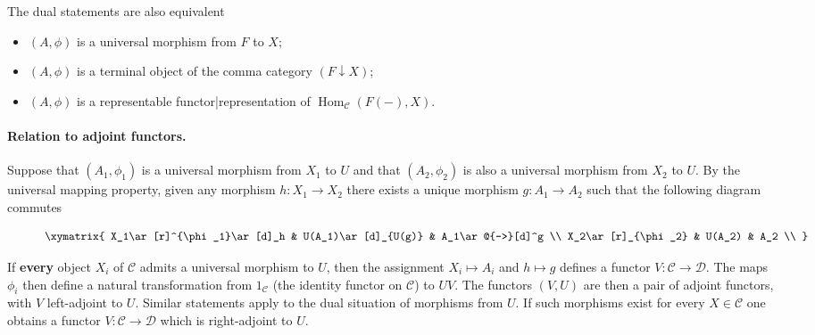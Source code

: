\documentclass[12pt]{article}
\newcommand{\Hom}{\operatorname{Hom}}
\begin{document}
The dual statements are also equivalent
\begin{itemize}
\item $(A, \phi)$ is a universal morphism from $F$ to $X$;
\item $(A, \phi)$ is a terminal object of the comma category $(F
  \downarrow X)$;
\item $(A, \phi)$ is a representable functor|representation of
  $\Hom_{\mathcal{C}}(F(-),X)$.
\end{itemize}


\paragraph{Relation to adjoint functors.}
Suppose that $(A_1, \phi_1)$ is a universal morphism from $X_1$ to $U$
and that $(A_2,\phi_2)$ is also a universal morphism from $X_2$ to $U$.
By the universal mapping property, given any morphism $h \colon X_1 \to X_2$
there exists a unique morphism $g \colon A_1 \to A_2$ such that the
following diagram commutes
\begin{figure}[h]
  \[\xymatrix{
     X_1\ar[r]^{\phi_1}\ar[d]_h & U(A_1)\ar[d]_{U(g)} & A_1\ar@{-->}[d]^g \\
     X_2\ar[r]_{\phi_2} & U(A_2) & A_2 \\
   }\]
\end{figure}
If \textbf{every} object $X_i$ of $\mathcal{C}$ admits a universal morphism to
$U$, then the assignment $X_i\mapsto A_i$ and $h \mapsto g$ defines a
functor $V\colon \mathcal{C} \to \mathcal{D}$. The maps $\phi_i$ then define a natural
transformation from $1_{\mathcal{C}}$ (the identity functor on $\mathcal{C}$) to $U
V$. The functors $(V, U)$ are then a pair of adjoint functors, with
$V$ left-adjoint to $U$.
Similar statements apply to the dual situation of morphisms from
$U$. If such morphisms exist for every $X\in \mathcal{C}$ one obtains a
functor $V \colon \mathcal{C} \to \mathcal{D}$ which is right-adjoint to $U$.
\end{document}

